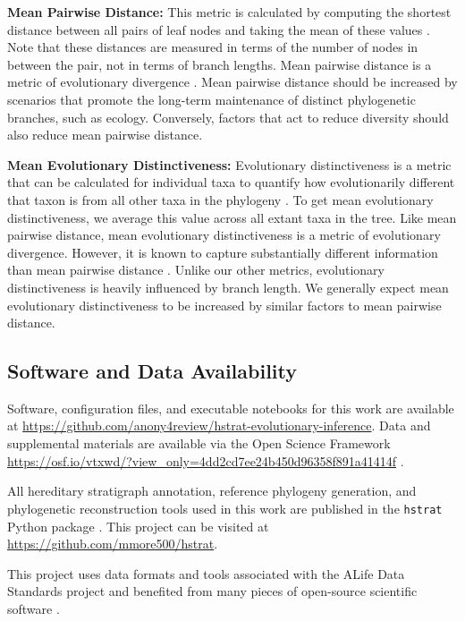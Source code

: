 \textbf{Mean Pairwise Distance:}
This metric is calculated by computing the shortest distance between all pairs of leaf nodes and taking the mean of these values \citep{webbExploringPhylogeneticStructure2000}.
Note that these distances are measured in terms of the number of nodes in between the pair, not in terms of branch lengths.
Mean pairwise distance is a metric of evolutionary divergence \citep{tuckerGuidePhylogeneticMetrics2017}.
Mean pairwise distance should be increased by scenarios that promote the long-term maintenance of distinct phylogenetic branches, such as ecology.
Conversely, factors that act to reduce diversity should also reduce mean pairwise distance.

\textbf{Mean Evolutionary Distinctiveness:}
Evolutionary distinctiveness is a metric that can be calculated for individual taxa to quantify how evolutionarily different that taxon is from all other taxa in the phylogeny \citep{isaacMammalsEDGEConservation2007}.
To get mean evolutionary distinctiveness, we average this value across all extant taxa in the tree.
Like mean pairwise distance, mean evolutionary distinctiveness is a metric of evolutionary divergence.
However, it is known to capture substantially different information than mean pairwise distance \citep{tuckerGuidePhylogeneticMetrics2017}.
Unlike our other metrics, evolutionary distinctiveness is heavily influenced by branch length.
We generally expect mean evolutionary distinctiveness to be increased by similar factors to mean pairwise distance.

\subsection{Software and Data Availability}

Software, configuration files, and executable notebooks for this work are available at \url{https://github.com/anony4review/hstrat-evolutionary-inference}.
Data and supplemental materials are available via the Open Science Framework \url{https://osf.io/vtxwd/?view_only=4dd2cd7ee24b450d96358f891a41414f} \citep{foster2017open}.

All hereditary stratigraph annotation, reference phylogeny generation, and phylogenetic reconstruction tools used in this work are published in the \texttt{hstrat} Python package \citep{moreno2022hstrat}.
This project can be visited at \url{https://github.com/mmore500/hstrat}.

This project uses data formats and tools associated with the ALife Data Standards project \citep{lalejini2019data} and benefited from many pieces of open-source scientific software \citep{ofria2020empirical,sand2014tqdist,2020SciPy-NMeth,harris2020array,reback2020pandas,mckinney-proc-scipy-2010,sukumaran2010dendropy,cock2009biopython}.
